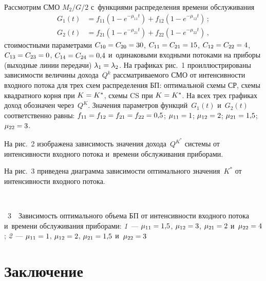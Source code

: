 \begin{multicols}{2}
  Рассмотрим СМО $M_2/G/2$ с~функциями распределения времени 
обслуживания 
\begin{align*}
G_1(t)&=f_{11}\left(1- e^{-\mu_{11}t}\right)+ f_{12}\left(1- e^{-
\mu_{12}t}\right)\,;\\
G_2(t)&= f_{21}\left(1- e^{-\mu_{21}t}\right)+ f_{22}\left(1- 
e^{-\mu_{22}t}\right)\,,
\end{align*}
 стоимостными параметрами $C_{10}\hm= C_{20}\hm= 30$, 
$C_{11}\hm= C_{21} \hm= 15$, $C_{12}\hm=C_{22} \hm=4$, $C_{13}\hm= 
C_{23}\hm=0$, $C_{14}\hm= C_{24}\hm=0{,}4$ и~одинаковыми входными 
потоками на приборы (выходные линии передачи) $\lambda_1\hm=\lambda_2$. 
На графиках рис.~1 проиллюстрированы за\-ви\-си\-мости величины дохода~$Q^k$ 
рас\-смат\-ри\-ва\-емо\-го СМО от интенсивности входного потока для трех схем 
распределения БП: оптимальной схемы СР, схемы квад\-рат\-но\-го корня при 
$K\hm=K^*$, схемы CS при $K\hm=K^*$. На всех трех графиках доход 
обозначен через~$Q^K$. Значения па\-ра\-мет\-ров функций~$G_1(t)$ и~$G_2(t)$ 
соответственно равны: $f_{11}\hm= f_{12}\hm= f_{21}\hm= f_{22}\hm= 0{,}5$; 
$\mu_{11}\hm= 1$; $\mu_{12}\hm= 2$; $\mu_{21}\hm= 1{,}5$; 
$\mu_{22}\hm=3$. 

На рис.~2 изображена зависимость значения 
дохода~$Q^{K^*}$ системы от интенсивности входного потока и~времени 
обслуживания приборами. 




На рис.~3 приведена диаграмма зависимости оптимального значения~$K^*$ от 
интенсивности входного потока. 

{ \begin{center}  %
 \vspace*{20pt}
  \mbox{%
 \epsfxsize=75.551mm 
 }


\end{center}


\noindent
{{\figurename~3}\ \ \small{Зависимость оптимального объема БП от интенсивности входного потока 
и~времени обслуживания приборами:
\textit{1}~---  
$\mu_{11}\hm=1{,}5$, $\mu_{12}\hm= 3$, $\mu_{21}\hm= 2$ 
и~$\mu_{22}\hm=4$; \textit{2}~--- $\mu_{11}\hm=1$, 
$\mu_{12}\hm=2$, $\mu_{21}\hm= 1{,}5$ и~$\mu_{22}\hm=3$}}
}


\addtocounter{figure}{1}

\section{Заключение}


\end{multicols}
